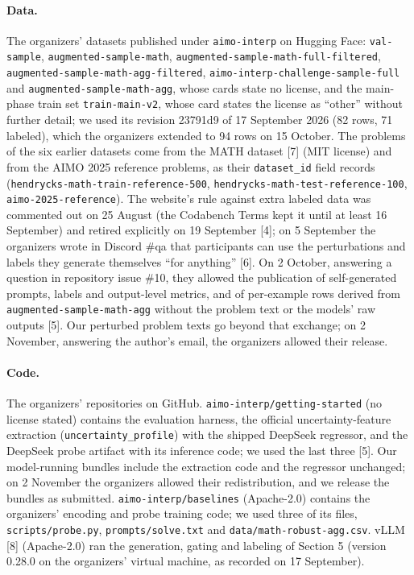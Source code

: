 \paragraph{Data.} The organizers' datasets published under \texttt{aimo-interp} on Hugging Face: \texttt{val-sample}, \texttt{augmented-sample-math}, \texttt{augmented-sample-math-full-filtered}, \texttt{augmented-sample-math-agg-filtered}, \texttt{aimo-interp-challenge-sample-full} and \texttt{augmented-sample-math-agg}, whose cards state no license, and the main-phase train set \texttt{train-main-v2}, whose card states the license as ``other'' without further detail; we used its revision 23791d9 of 17 September 2026 (82 rows, 71 labeled), which the organizers extended to 94 rows on 15 October. The problems of the six earlier datasets come from the MATH dataset [7] (MIT license) and from the AIMO 2025 reference problems, as their \texttt{dataset\_id} field records (\texttt{hendrycks-math-train-reference-500}, \texttt{hendrycks-math-test-reference-100}, \texttt{aimo-2025-reference}). The website's rule against extra labeled data was commented out on 25 August (the Codabench Terms kept it until at least 16 September) and retired explicitly on 19 September [4]; on 5 September the organizers wrote in Discord \#qa that participants can use the perturbations and labels they generate themselves ``for anything'' [6]. On 2 October, answering a question in repository issue \#10, they allowed the publication of self-generated prompts, labels and output-level metrics, and of per-example rows derived from \texttt{augmented-sample-math-agg} without the problem text or the models' raw outputs [5]. Our perturbed problem texts go beyond that exchange; on 2 November, answering the author's email, the organizers allowed their release.

\paragraph{Code.} The organizers' repositories on GitHub. \texttt{aimo-interp/getting-started} (no license stated) contains the evaluation harness, the official uncertainty-feature extraction (\texttt{uncertainty\_profile}) with the shipped DeepSeek regressor, and the DeepSeek probe artifact with its inference code; we used the last three [5]. Our model-running bundles include the extraction code and the regressor unchanged; on 2 November the organizers allowed their redistribution, and we release the bundles as submitted. \texttt{aimo-interp/baselines} (Apache-2.0) contains the organizers' encoding and probe training code; we used three of its files, \texttt{scripts/probe.py}, \texttt{prompts/solve.txt} and \texttt{data/math-robust-agg.csv}. vLLM [8] (Apache-2.0) ran the generation, gating and labeling of Section 5 (version 0.28.0 on the organizers' virtual machine, as recorded on 17 September).



